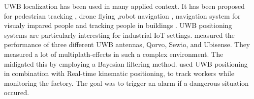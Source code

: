 UWB localization has been used in many applied context.
It has been proposed for pedestrian tracking \cite{otim2019effects}, drone flying \cite{macoir2019uwb},robot navigation \cite{zhu2020adapted}, navigation system for visualy impared people \cite{rosiak2024effectiveness} and tracking people in buildings \cite{elbaum2024investigating}.
UWB positioning systems are particularly interesting for industrial IoT settings.
\cite{barbieri2021uwb} measured the performance of three different UWB antennas, Qorvo, Sewio, and Ubisense. They measured a lot of multiplath-effects in such a complex environment. The midigated this by employing a Bayesian filtering method.
\cite{belli2024cloud} used UWB positioning in combination with Real-time kinematic positioning, to track workers while monitoring the factory. The goal was to trigger an alarm if a dangerous situation occured.

